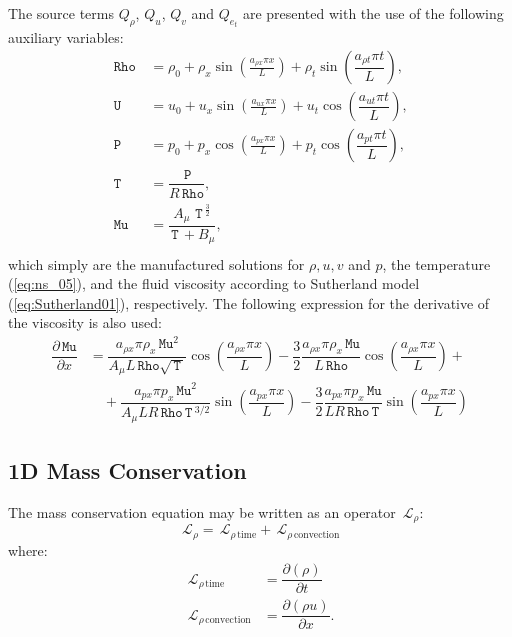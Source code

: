 \documentclass[10pt]{article}
\newcommand{\Diff}[2] {\dfrac{\partial( #1)}{\partial #2}}
\newcommand{\diff}[2] {\dfrac{\partial #1}{\partial #2}}
\newcommand{\Rho}{\,\mathtt{Rho}}
\newcommand{\PP}{\,\mathtt{P}}
\newcommand{\U}{\,\mathtt{U}}
\newcommand{\Lo}{\,\mathcal{L}}
\newcommand{\Mu}{\,\mathtt{Mu}}
\newcommand{\T}{\,\mathtt{T}\,}
\newcommand{\DMuDx}{\diff{\Mu}{x}}
\begin{document}
The source terms $Q_\rho$, $Q_u$, $Q_v$ and $Q_{e_t}$ are  presented with the use of the following auxiliary variables:\begin{equation}
 \begin{split}
\label{eq:aux_01}
\Rho \, &= \rho_{0}+ \rho_{x} \sin\left(\frac{a_{ \rho  x} \pi x}{L}\right)+  \rho_t \sin\left(\dfrac{a_{\rho t} \pi t}{L}\right),\\
%
\U&=u_{0}+u_{x} \sin\left(\frac{a_{u  x} \pi x}{L}\right)+ u_t \cos\left(\dfrac{a_{u t} \pi t}{L}\right) ,\\
%
\PP \, &= p_{0}+p_{x} \cos\left(\frac{a_{p  x} \pi x}{L}\right)+ p_t \cos\left(\dfrac{a_{p t} \pi t}{L}\right),\\
\T&= \dfrac{\PP}{R\Rho},\\
\Mu  &=\dfrac{A_\mu \, \T^{\frac{3}{2}}}{\T+B_\mu},\\
\end{split}
\end{equation}
which simply are the manufactured solutions for $\rho, u, v$ and $p$, the temperature (\ref{eq:ns_05}), and  the fluid viscosity according to Sutherland model (\ref{eq:Sutherland01}), respectively. The following expression for the derivative of the viscosity is also used:
\begin{equation}
\begin{split}\label{eq:aux_02}
\DMuDx &= \dfrac{a_{\rho x} \pi \rho_x \Mu^2 }{A_{\mu} L \Rho \sqrt{\T}}\cos\left(\dfrac{a_{\rho x} \pi x}{L}\right)-\dfrac{3}{2} \dfrac{a_{\rho x} \pi \rho_x \Mu }{L \Rho}\cos\left(\dfrac{a_{\rho x} \pi x}{L}\right) + \\ 
&\quad+\dfrac{a_{px} \pi p_x \Mu^2 }{A_{\mu} L R \Rho \T^{3/2}}\sin\left(\dfrac{a_{px} \pi x}{L}\right)-\dfrac{3}{2} \dfrac{a_{px} \pi p_x \Mu }{L R \Rho \T}\sin\left(\dfrac{a_{px} \pi x}{L}\right)
\end{split}
\end{equation}

\subsection{1D Mass Conservation}
The mass conservation equation may be written as an operator $\Lo_\rho$:
$$ \Lo_{\rho} = \Lo_{\rho \, \text{time}}+\Lo_{\rho \, \text{convection}}$$
where:
\begin{equation}
\begin{split}\label{eq:rho_operators}
\Lo_{\rho \, \text{time}}&=\Diff{\rho}{t} \\
\Lo_{\rho \, \text{convection}}&=\Diff{\rho u}{x} .
\end{split}
 \end{equation}
\end{document}
